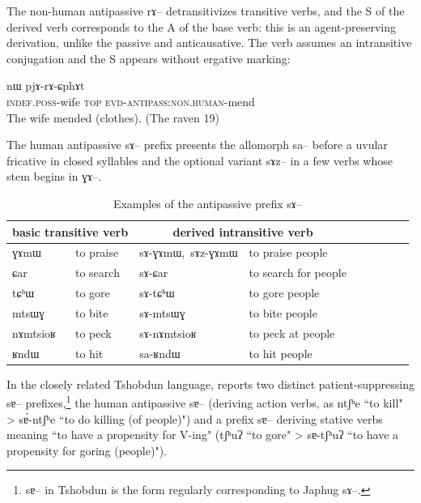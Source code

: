 \documentclass[oldfontcommands,oneside,a4paper,11pt]{article}
\newcommand{\ipa}[1]{{\phon \mbox{#1}}} %
\begin{document}
The non-human antipassive \ipa{rɤ}-- detransitivizes transitive verbs, and the S of the derived verb corresponds to the A of the base verb: this is an agent-preserving derivation, unlike the passive and anticausative. The verb assumes an intransitive conjugation and the S   appears without ergative marking:

  \begin{exe}
\ex
\gll \ipa{tɤ-rʑaβ} 	\ipa{nɯ} 	\ipa{pjɤ-rɤ-ɕphɤt}   \\
    \textsc{indef.poss}-wife \textsc{top} \textsc{evd-antipass:non.human}-mend \\
 \glt    The wife mended (clothes). (The raven 19)
\end{exe} 


The human antipassive \ipa{sɤ}-- prefix   presents the allomorph \ipa{sa}-- before a uvular fricative in closed syllables  and the optional variant \ipa{sɤz}-- in a few verbs whose stem begins in \ipa{ɣɤ--}.


\begin{table}[H]
\caption{Examples of the antipassive prefix \ipa{sɤ}--}\label{tab:antipassive.jpg2}
\begin{tabular}{lllllllll} \toprule
\multicolumn{2}{c}{basic transitive verb} &\multicolumn{2}{c}{derived  intransitive verb}\\
\midrule
\ipa{ɣɤmɯ}   &	to praise &  	\ipa{sɤ-ɣɤmɯ, sɤz-ɣɤmɯ}   & to praise people\\  
\ipa{ɕar}   &	to search &  	\ipa{sɤ-ɕar}   &to search for people \\ 
\ipa{tɕʰɯ}   &	to gore &  	\ipa{sɤ-tɕʰɯ}  & to gore people \\  
\ipa{mtsɯɣ}   &	to bite &  	\ipa{sɤ-mtsɯɣ}  & to bite people  \\  
\ipa{nɤmtsioʁ}   &	to peck &  	\ipa{sɤ-nɤmtsioʁ}    & to peck at people\\  
\ipa{ʁndɯ}   &	to hit &  	\ipa{sa-ʁndɯ}   &	to hit people    \\  
\bottomrule
\end{tabular}
\end{table}

 
In the closely related Tshobdun language, \citet{jackson13morpho} reports two distinct patient-suppressing \ipa{sɐ}-- prefixes,\footnote{\ipa{sɐ}-- in Tshobdun is the form regularly corresponding to Japhug \ipa{sɤ}--.} the human antipassive \ipa{sɐ}-- (deriving action verbs, as \ipa{ntʃʰe} ``to kill" > \ipa{sɐ́-ntʃʰe} ``to do killing (of people)") and a prefix \ipa{sɐ}-- deriving stative verbs meaning ``to have a propensity for V-ing" (\ipa{tʃʰuʔ} ``to gore" > \ipa{sɐ-tʃʰuʔ} ``to have a propensity for goring (people)").
\end{document}
